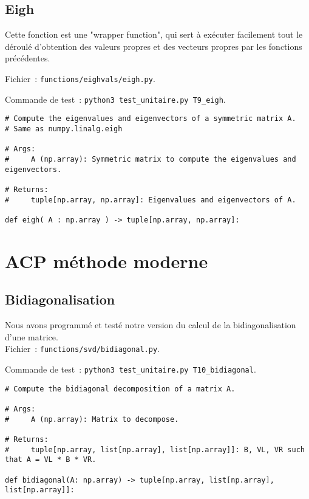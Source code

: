 \documentclass{article}
\begin{document}
\subsection{Eigh}

Cette fonction est une "wrapper function", qui sert à exécuter facilement tout le déroulé d'obtention des valeurs propres et des vecteurs propres par les fonctions précédentes.

Fichier~: \texttt{functions/eighvals/eigh.py}.

Commande de test~: \texttt{python3 test\_unitaire.py T9\_eigh}.

\begin{small}
\begin{verbatim}
# Compute the eigenvalues and eigenvectors of a symmetric matrix A.
# Same as numpy.linalg.eigh

# Args:
#     A (np.array): Symmetric matrix to compute the eigenvalues and eigenvectors.

# Returns:
#     tuple[np.array, np.array]: Eigenvalues and eigenvectors of A.

def eigh( A : np.array ) -> tuple[np.array, np.array]:
\end{verbatim}
\end{small}

\section{ACP méthode moderne}

\subsection{Bidiagonalisation}

Nous avons programmé et testé notre version du calcul de la bidiagonalisation d'une matrice. \\

Fichier~: \texttt{functions/svd/bidiagonal.py}.

Commande de test~: \texttt{python3 test\_unitaire.py T10\_bidiagonal}.

\begin{small}
\begin{verbatim}
# Compute the bidiagonal decomposition of a matrix A.

# Args:
#     A (np.array): Matrix to decompose.

# Returns:
#     tuple[np.array, list[np.array], list[np.array]]: B, VL, VR such that A = VL * B * VR.

def bidiagonal(A: np.array) -> tuple[np.array, list[np.array], list[np.array]]:
\end{verbatim}
\end{small}
\end{document}
